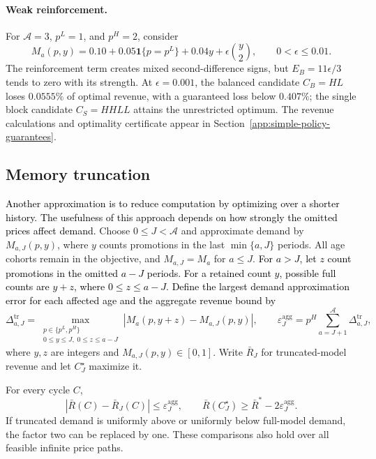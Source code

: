 \paragraph{Weak reinforcement.}
For \(\mathcal A=3\), \(p^L=1\), and \(p^H=2\), consider
\[
 M_a(p,y)=0.10+0.05\mathbf1\{p=p^L\}
 +0.04y+\epsilon\binom y2,
 \qquad 0<\epsilon\le0.01.
\]
\begingroup\color{black}
The reinforcement term creates mixed second-difference signs, but \(E_B=11\epsilon/3\) tends to zero with its strength. At \(\epsilon=0.001\), the balanced candidate \(C_B=HL\) loses \(0.0555\%\) of optimal revenue, with a guaranteed loss below \(0.407\%\); the single block candidate \(C_S=HHLL\) attains the unrestricted optimum. The revenue calculations and optimality certificate appear in Section~\ref{app:simple-policy-guarantees}.
\par\endgroup
\par\endgroup

\begingroup\color{black}
\subsection{Memory truncation}
\label{sec:general-truncation}
\label{sec:computation}

\textcolor{black}{Another approximation is to reduce computation by optimizing over a shorter history. The usefulness of this approach depends on how strongly the omitted prices affect demand.} Choose \(0\le J<\mathcal A\) and approximate demand by \(M_{a,J}(p,y)\), where \(y\) counts promotions in the last \(\min\{a,J\}\) periods. All age cohorts remain in the objective, and \(M_{a,J}=M_a\) for \(a\le J\). \textcolor{black}{For \(a>J\), let \(z\) count promotions in the omitted \(a-J\) periods. For a retained count \(y\), possible full counts are \(y+z\), where \(0\le z\le a-J\). Define the largest demand approximation error for each affected age and the aggregate revenue bound by}
\[
 \Delta^{\mathrm{tr}}_{a,J}
 =\max_{\substack{p\in\{p^L,p^H\}\\
 0\le y\le J,\;0\le z\le a-J}}
 |M_a(p,y+z)-M_{a,J}(p,y)|,
 \qquad
 \varepsilon_J^{\mathrm{agg}}
 =p^H\sum_{a=J+1}^{\mathcal A}\Delta^{\mathrm{tr}}_{a,J},
\]
where \(y,z\) are integers and \(M_{a,J}(p,y)\in[0,1]\). Write \(\bar R_J\) for truncated-model revenue and let \(C_J^\star\) maximize it.

\begin{proposition}
\label{prop:general-truncation}
For every cycle \(C\),
\[
 |\bar R(C)-\bar R_J(C)|\le\varepsilon_J^{\mathrm{agg}},
 \qquad
 \bar R(C_J^\star)\ge\bar R^*-2\varepsilon_J^{\mathrm{agg}}.
\]
If truncated demand is uniformly above or uniformly below full-model demand, the factor two can be replaced by one. These comparisons also hold over all feasible infinite price paths.
\end{proposition}

